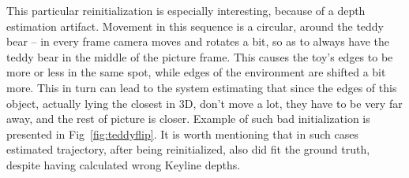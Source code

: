 This particular reinitialization is especially interesting, because of a depth estimation artifact. Movement in this sequence is a circular, around the teddy bear -- in every frame camera moves and rotates a bit, so as to always have the teddy bear in the middle of the picture frame. This causes the toy's edges to be more or less in the same spot, while edges of the environment are shifted a bit more. This in turn can lead to the system estimating that since the edges of this object, actually lying the closest in 3D, don't move a lot, they have to be very far away, and the rest of picture is closer. Example of such bad initialization is presented in Fig~\ref{fig:teddyflip}. It is worth mentioning that in such cases estimated trajectory, after being reinitialized, also did fit the ground truth, despite having calculated wrong Keyline depths.

